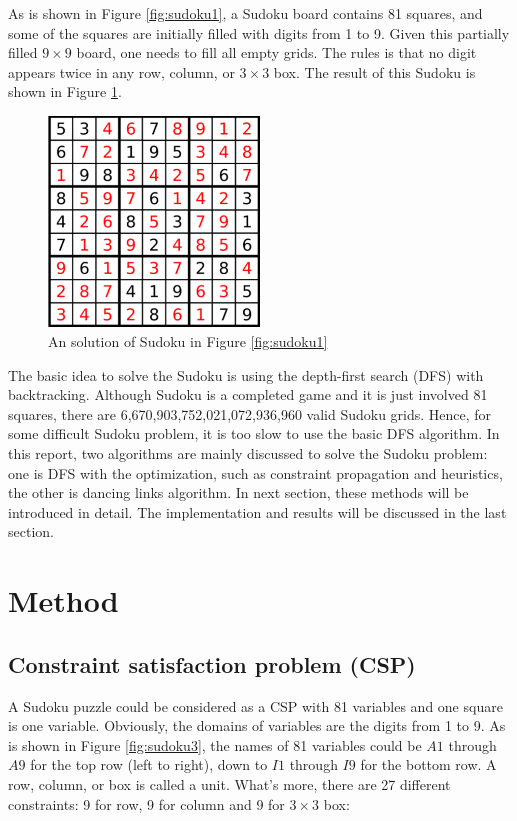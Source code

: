 	As is shown in Figure \ref{fig:sudoku1}, a Sudoku board contains 81 squares, and some of the squares are initially filled with digits from 1 to 9.
	Given this partially filled $9 \times 9$ board, one needs to fill all empty grids.
	The rules is that no digit appears twice in any row, column, or $3 \times 3$ box.  
	The result of this Sudoku is shown in Figure \ref{fig:sudoku2}.  

	\begin{figure}[ht]
	\centering
	\includegraphics[width=0.5\textwidth]{figure/sudoku2.png}
	\caption{An solution of Sudoku in Figure \ref{fig:sudoku1}}
	\label{fig:sudoku2}
	\end{figure}

	The basic idea to solve the Sudoku is using the depth-first search (DFS) with backtracking. 
	Although Sudoku is a completed game and it is just involved 81 squares, there are 6,670,903,752,021,072,936,960 valid Sudoku grids.  
	Hence, for some difficult Sudoku problem, it is too slow to use the basic DFS algorithm. 
	In this report, two algorithms are mainly discussed to solve the Sudoku problem: one is DFS with the optimization, such as constraint propagation and heuristics, the other is dancing links algorithm. 
	In next section, these methods will be introduced in detail.  
	The implementation and results will be discussed in the last section.


\section{Method}

	\subsection{Constraint satisfaction problem (CSP)}
		A Sudoku puzzle could be considered as a CSP with 81 variables and one square is one variable. 
		Obviously, the domains of variables are the digits from 1 to 9. 
		As is shown in Figure \ref{fig:sudoku3}, the names of 81 variables could be $A1$ through $A9$ for the top row (left to right), down to $I1$ through $I9$ for the bottom row. 
		A row, column, or box is called a unit. 
		What’s more, there are 27 different constraints: 9 for row, 9 for column and 9 for $3 \times 3$ box:

